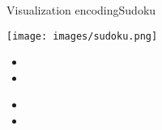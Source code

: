 \begin{frame}{Visualization encoding}{Sudoku}
  \centering
  \begin{minipage}{.3\textwidth}
    \texttt{[image: images/sudoku.png]}
  \end{minipage}
  \begin{minipage}{.3\textwidth}
    \begin{itemize}
      \item {}
      \item {}
    \end{itemize}
  \end{minipage}
  \begin{minipage}{.3\textwidth}
    \begin{itemize}
      \item {}
      \item {}
    \end{itemize}
  \end{minipage}
  \pause
  \bigskip
  
\end{frame}
